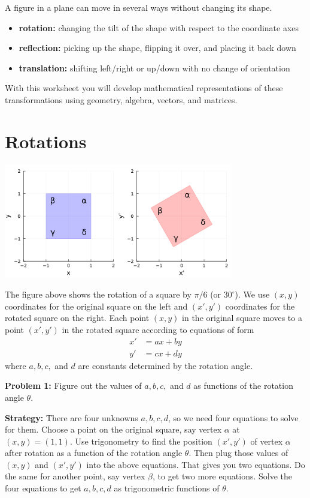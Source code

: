\documentclass[letter]{article}
\begin{document}
A figure in a plane can move in several ways without changing its shape.
\begin{itemize}
\item {\bf rotation:} changing the tilt of the shape with respect to the coordinate axes
\item {\bf reflection:} picking up the shape, flipping it over, and placing it back down
\item {\bf translation:} shifting left/right or up/down with no change of orientation
\end{itemize}
With this worksheet you will develop mathematical representations of these transformations
using geometry, algebra, vectors, and matrices.

\section{Rotations}

\begin{center}
\includegraphics[width=0.75\textwidth]{rotation_square.png}
\end{center}
The figure above shows the rotation of a square by $\pi/6$ (or $30^\circ$).
We use $(x,y)$ coordinates for the original square on the left and $(x',y')$
coordinates for the rotated square on the right. Each point $(x,y)$ in the
original square moves to a point $(x', y')$ in the rotated square according to
equations of form
\begin{align}
  x' &= ax + by \\
  y' &= cx + dy \nonumber
\end{align}
where $a,b,c,$ and $d$ are constants determined by the rotation angle. 

\vspace{2mm}
{\bf Problem 1:} Figure out the values of $a,b,c,$ and $d$ as functions
of the rotation angle $\theta$. 

\vspace{2mm}
{\bf Strategy:} There are four unknowns $a,b,c,d$, so we need four equations to solve for them.
Choose a point on the original square, say vertex $\alpha$ at $(x,y) = (1,1)$. Use trigonometry
to find the position $(x',y')$ of vertex $\alpha$ after rotation as a function of the rotation angle
$\theta$. Then plug those values of $(x,y)$ and $(x',y')$ into the above equations. That gives
you two equations. Do the same for another point, say vertex $\beta$, to get two more equations.
Solve the four equations to get $a,b,c,d$ as trigonometric functions of $\theta$.
\end{document}
